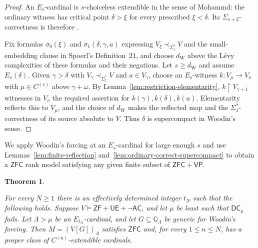 \documentclass[11pt,a4paper]{amsart}
\newcommand{\VP}{\mathsf{VP}}
\newcommand{\AC}{\mathsf{AC}}
\newcommand{\ZF}{\mathsf{ZF}}
\newcommand{\ZFC}{\mathsf{ZFC}}
\newcommand{\restr}{\mathbin{\upharpoonright}}
\newcommand{\DC}{\mathsf{DC}}
\newcommand{\UE}{\mathsf{UE}}
\theoremstyle{plain}
\newtheorem{theorem}{Theorem}[section]
\theoremstyle{definition}
\theoremstyle{remark}
\begin{document}
\begin{proof}
An $E_s$-cardinal is $s$-choiceless extendible in the sense of Mohammd: the ordinary witness has critical point $\delta>\xi$ for every prescribed $\xi<\delta$.  Its $\Sigma_{s+2}$-correctness is therefore \cite[Proposition~2.2]{Mohammd}.

Fix formulas $\sigma_0(\xi)$ and $\sigma_1(\delta,\gamma,a)$ expressing $V_\xi\prec_{\Sigma_1^*}V$ and the small-embedding clause in Spoerl's Definition~21, and choose $d_{\mathrm W}$ above the L\'evy complexities of these formulas and their negations.  Let $s\geq d_{\mathrm W}$ and assume $E_s(\delta)$.  Given $\gamma>\delta$ with $V_\gamma\prec_{\Sigma_1^*}V$ and $a\in V_\gamma$, choose an $E_s$-witness $k:V_\mu\to V_\nu$ with $\mu\in C^{(s)}$ above $\gamma+\omega$.  By Lemma~\ref{lem:restriction-elementarity}, $k\restr V_{\gamma+1}$ witnesses in $V_\nu$ the required assertion for $k(\gamma),k(\delta),k(a)$.  Elementarity reflects this to $V_\mu$, and the choice of $d_{\mathrm W}$ makes the reflected map and the $\Sigma_1^*$-correctness of its source absolute to $V$.  Thus $\delta$ is supercompact in Woodin's sense.
\end{proof}

We apply Woodin's forcing at an $E_s$-cardinal for large enough $s$ and use Lemmas~\ref{lem:finite-reflection} and~\ref{lem:ordinary-correct-supercompact} to obtain a $\ZFC$ rank model satisfying any given finite subset of $\ZFC+\VP$.

\begin{theorem}\label{thm:finite-restoration}

For every $N\geq1$ there is an effectively determined integer $t_N$ such that the following holds.  Suppose $V\models\ZF+\UE+\neg\AC$, and let $\mu$ be least such that $\DC_\mu$ fails.  Let $\Lambda>\mu$ be an $E_{t_N}$-cardinal, and let $G\subseteq\mathbb Q_\Lambda$ be generic for Woodin's forcing.  Then $M=(V[G])_\Lambda$ satisfies $\ZFC$ and, for every $1\leq n\leq N$, has a proper class of $C^{(n)}$-extendible cardinals.
\end{theorem}
\end{document}
